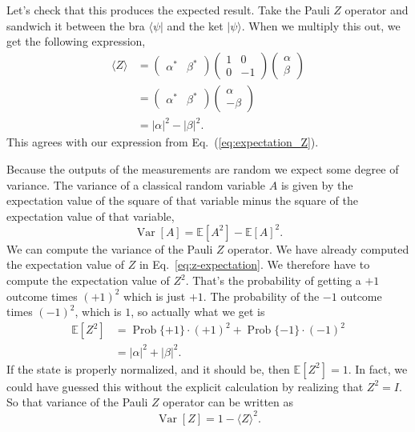 Let's check that this produces the expected result. Take the Pauli $Z$ operator and sandwich it between the bra $\langle\psi|$ and the ket $|\psi\rangle$. When we multiply this out, we get the following expression,
\begin{equation}
    \begin{aligned}
    \langle Z\rangle &=\left(\begin{array}{ll}
    \alpha^{*} & \beta^{*}
    \end{array}\right)\left(\begin{array}{cc}
    1 & 0 \\
    0 & -1
    \end{array}\right)\left(\begin{array}{l}
    \alpha \\
    \beta
    \end{array}\right) \\
    &=\left(\begin{array}{ll}
    \alpha^{*} & \beta^{*}
    \end{array}\right)\left(\begin{array}{c}
    \alpha \\
    -\beta
    \end{array}\right) \\
    &=|\alpha|^{2}-|\beta|^{2}.
    \end{aligned}
    \label{eq:z-expectation}
\end{equation}
This agrees with our expression from Eq.~(\ref{eq:expectation_Z}).

Because the outputs of the measurements are random we expect some degree of variance. The variance of a classical random variable $A$ is given by the expectation value of the square of that variable minus the square of the expectation value of that variable,
\begin{equation}
    \operatorname{Var}[A] =\mathbb{E}\left[A^{2}\right]-\mathbb{E}[A]^{2}.
\end{equation}
We can compute the variance of the Pauli $Z$ operator.
We have already computed the expectation value of $Z$ in Eq.~\ref{eq:z-expectation}. We therefore have to compute the expectation value of $Z^2$. That's the probability of getting a $+1$ outcome times $(+1)^2$ which is just $+1$.  The probability of the $-1$ outcome times $(-1)^2$, which is $1$, so actually what we get is
\begin{equation}
\begin{aligned}
    \mathbb{E}\left[Z^{2}\right] &=\operatorname{Prob}\{+1\} \cdot(+1)^{2}+\operatorname{Prob}\{-1\} \cdot(-1)^{2} \\
    &=|\alpha|^{2}+|\beta|^{2}.
\end{aligned}
\end{equation}
If the state is properly normalized, and it should be, then $\mathbb{E}[Z^{2}]=1$.
In fact, we could have guessed this without the explicit calculation by realizing that $Z^2=I$.
So that variance of the Pauli $Z$ operator can be written as
\begin{equation}
    \operatorname{Var}[Z] = 1 - \langle Z \rangle^2.
\end{equation}

